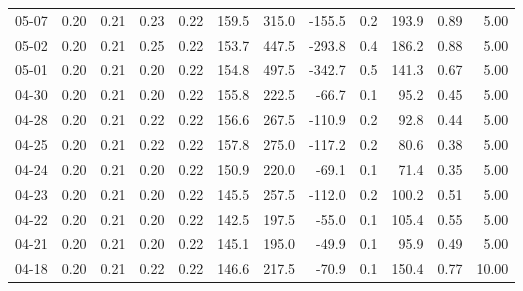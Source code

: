 \begin{threeparttable}
{\begin{tabular}{lrrrrrrrrrrr}
  05-07 &          0.20 &          0.21 &          0.23 &        0.22 &               159.5 &               315.0 &     -155.5 &                 0.2 &            193.9 &            0.89 &                   5.00 \\
  05-02 &          0.20 &          0.21 &          0.25 &        0.22 &               153.7 &               447.5 &     -293.8 &                 0.4 &            186.2 &            0.88 &                   5.00 \\
  05-01 &          0.20 &          0.21 &          0.20 &        0.22 &               154.8 &               497.5 &     -342.7 &                 0.5 &            141.3 &            0.67 &                   5.00 \\
  04-30 &          0.20 &          0.21 &          0.20 &        0.22 &               155.8 &               222.5 &      -66.7 &                 0.1 &             95.2 &            0.45 &                   5.00 \\
  04-28 &          0.20 &          0.21 &          0.22 &        0.22 &               156.6 &               267.5 &     -110.9 &                 0.2 &             92.8 &            0.44 &                   5.00 \\
  04-25 &          0.20 &          0.21 &          0.22 &        0.22 &               157.8 &               275.0 &     -117.2 &                 0.2 &             80.6 &            0.38 &                   5.00 \\
  04-24 &          0.20 &          0.21 &          0.20 &        0.22 &               150.9 &               220.0 &      -69.1 &                 0.1 &             71.4 &            0.35 &                   5.00 \\
  04-23 &          0.20 &          0.21 &          0.20 &        0.22 &               145.5 &               257.5 &     -112.0 &                 0.2 &            100.2 &            0.51 &                   5.00 \\
  04-22 &          0.20 &          0.21 &          0.20 &        0.22 &               142.5 &               197.5 &      -55.0 &                 0.1 &            105.4 &            0.55 &                   5.00 \\
  04-21 &          0.20 &          0.21 &          0.20 &        0.22 &               145.1 &               195.0 &      -49.9 &                 0.1 &             95.9 &            0.49 &                   5.00 \\
  04-18 &          0.20 &          0.21 &          0.22 &        0.22 &               146.6 &               217.5 &      -70.9 &                 0.1 &            150.4 &            0.77 &                  10.00 \\

\end{tabular}}
\end{threeparttable}
